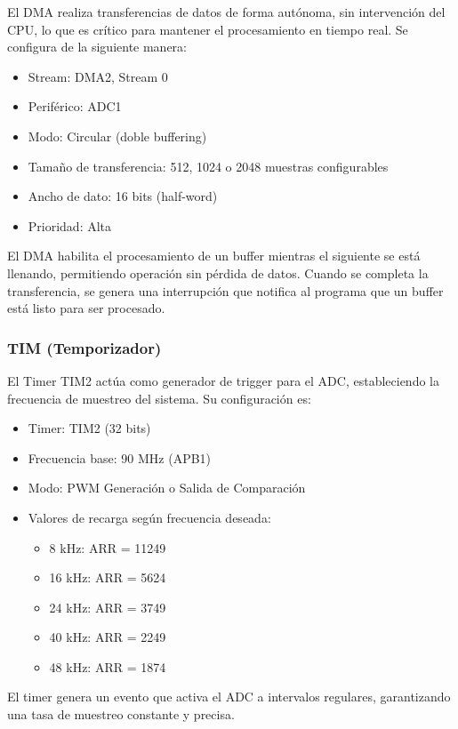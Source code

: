 \documentclass[12pt]{article}
\begin{document}
				El DMA realiza transferencias de datos de forma autónoma, sin intervención del CPU, lo que es crítico para mantener el procesamiento en tiempo real. Se configura de la siguiente manera:

				\begin{itemize}
					\item Stream: DMA2, Stream 0
					\item Periférico: ADC1
					\item Modo: Circular (doble buffering)
					\item Tamaño de transferencia: 512, 1024 o 2048 muestras configurables
					\item Ancho de dato: 16 bits (half-word)
					\item Prioridad: Alta
				\end{itemize}

				El DMA habilita el procesamiento de un buffer mientras el siguiente se está llenando, permitiendo operación sin pérdida de datos. Cuando se completa la transferencia, se genera una interrupción que notifica al programa que un buffer está listo para ser procesado.

			\subsubsection{TIM (Temporizador)}

				El Timer TIM2 actúa como generador de trigger para el ADC, estableciendo la frecuencia de muestreo del sistema. Su configuración es:

				\begin{itemize}
					\item Timer: TIM2 (32 bits)
					\item Frecuencia base: 90 MHz (APB1)
					\item Modo: PWM Generación o Salida de Comparación
					\item Valores de recarga según frecuencia deseada:
					\begin{itemize}
						\item 8 kHz: ARR = 11249
						\item 16 kHz: ARR = 5624
						\item 24 kHz: ARR = 3749
						\item 40 kHz: ARR = 2249
						\item 48 kHz: ARR = 1874
					\end{itemize}
				\end{itemize}

				El timer genera un evento que activa el ADC a intervalos regulares, garantizando una tasa de muestreo constante y precisa.
\end{document}
